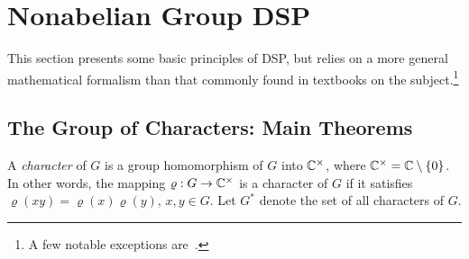 
\section{Nonabelian Group DSP}
This section presents some basic principles of
DSP, but relies on a more general mathematical formalism
than that commonly found in textbooks on the subject.\footnote{A few notable
  exceptions are~\cite{An:2003, Tolimieri:2003, Tolimieri:1998, Chirikjian:2002}.}

\subsection{The Group of Characters: Main Theorems}
A \emph{character} of $G$ is a group homomorphism of $G$
into $\mathbb{C}^{\times}$, where $\mathbb{C}^{\times} = \mathbb{C} \setminus \{0\}$.
In other words, the mapping $\varrho: G \to \mathbb{C}^{\times}$ is 
a character of $G$ if it satisfies 
$\varrho(xy) = \varrho(x)\varrho(y), \, x, y \in G$.
Let $G^*$ denote the set of all characters of $G$.

